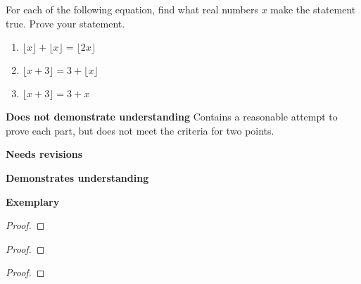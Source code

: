 \documentclass[letterpaper, 11pt]{../ximera}
\begin{document}
\begin{ex}
For each of the following equation, find what real numbers $x$ make the statement true. Prove your statement. 
	\begin{enumerate}
 		\item $\lfloor x \rfloor + \lfloor x \rfloor =\lfloor 2x\rfloor$
		\item $\lfloor x + 3 \rfloor  = 3 +\lfloor x\rfloor$
		\item $\lfloor x +3 \rfloor = 	3 + x$
	\end{enumerate} 
\end{ex}

\begin{writeRubric}
    \item \textbf{Does not demonstrate understanding}
     Contains a reasonable attempt to prove each part, but does not meet the criteria for two points.
    \item \textbf{Needs revisions}
     
    \item \textbf{Demonstrates understanding}
    
    \item \textbf{Exemplary}
        
\end{writeRubric}
                                       
\begin{solution}
		
\begin{proof}
 
\end{proof}

\begin{proof}
 
\end{proof}
\begin{proof}
 
\end{proof}
\end{solution}
	
\end{document}
